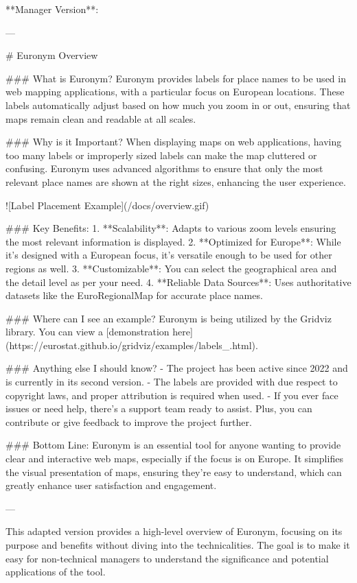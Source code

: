 **Manager Version**:

---

# Euronym Overview

### What is Euronym?
Euronym provides labels for place names to be used in web mapping applications, with a particular focus on European locations. These labels automatically adjust based on how much you zoom in or out, ensuring that maps remain clean and readable at all scales.

### Why is it Important?
When displaying maps on web applications, having too many labels or improperly sized labels can make the map cluttered or confusing. Euronym uses advanced algorithms to ensure that only the most relevant place names are shown at the right sizes, enhancing the user experience.

![Label Placement Example](/docs/overview.gif)

### Key Benefits:
1. **Scalability**: Adapts to various zoom levels ensuring the most relevant information is displayed.
2. **Optimized for Europe**: While it's designed with a European focus, it’s versatile enough to be used for other regions as well.
3. **Customizable**: You can select the geographical area and the detail level as per your need.
4. **Reliable Data Sources**: Uses authoritative datasets like the EuroRegionalMap for accurate place names.

### Where can I see an example?
Euronym is being utilized by the Gridviz library. You can view a [demonstration here](https://eurostat.github.io/gridviz/examples/labels_.html).

### Anything else I should know?
- The project has been active since 2022 and is currently in its second version.
- The labels are provided with due respect to copyright laws, and proper attribution is required when used.
- If you ever face issues or need help, there’s a support team ready to assist. Plus, you can contribute or give feedback to improve the project further.

### Bottom Line:
Euronym is an essential tool for anyone wanting to provide clear and interactive web maps, especially if the focus is on Europe. It simplifies the visual presentation of maps, ensuring they’re easy to understand, which can greatly enhance user satisfaction and engagement.

--- 

This adapted version provides a high-level overview of Euronym, focusing on its purpose and benefits without diving into the technicalities. The goal is to make it easy for non-technical managers to understand the significance and potential applications of the tool.
